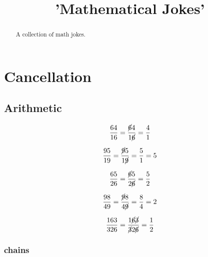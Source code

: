 \documentclass{article}
\title{'Mathematical Jokes'}
\date{}
\author{}
\begin{document}
\maketitle
\begin{abstract}
	A collection of math jokes.
\end{abstract}

\tableofcontents
\clearpage

\section{Cancellation}
\subsection{Arithmetic}

\begin{equation}
	\begin{split}
		\frac{64}{16}
		=
		\frac{\cancel{6}4}{1\cancel{6}}
		=
		\frac{4}{1}
	\end{split}
\end{equation}

\begin{equation}
	\begin{split}
		\frac{95}{19}
		=
		\frac{\cancel{9}5}{1\cancel{9}}
		=
		\frac{5}{1}
		=
		5
	\end{split}
\end{equation}

\begin{equation}
	\begin{split}
		\frac{65}{26}
		=
		\frac{\cancel{6}5}{2\cancel{6}}
		=
		\frac{5}{2}
	\end{split}
\end{equation}

\begin{equation}
	\begin{split}
		\frac{98}{49}
		=
		\frac{\cancel{9}8}{4\cancel{9}}
		=
		\frac{8}{4}
		=
		2
	\end{split}
\end{equation}

\begin{equation}
	\begin{split}
		\frac{163}{326}
		=
		\frac{1\cancel{6}\cancel{3}}{\cancel{3}2\cancel{6}}
		=
		\frac{1}{2}
	\end{split}
\end{equation}

\subsubsection{chains}
\end{document}
